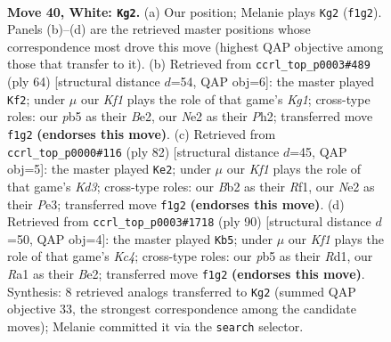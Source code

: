 \documentclass[11pt]{article}
\begin{document}
\clearpage

\begin{figure}[p]\centering
\begin{subfigure}{0.46\textwidth}\centering
\resizebox{\linewidth}{!}{%
\newchessgame
\chessboard[
  setfen={r5k1/4n3/8/pp6/b1p3P1/P1P1bN2/1B2N3/R4K2 w - - 4 40},
  showmover=false,
  pgfstyle=straightmove, color=movearrow, markmove={f1-g2}
]}
\caption{}
\end{subfigure}\hfill
\begin{subfigure}{0.46\textwidth}\centering
\resizebox{\linewidth}{!}{%
\newchessgame
\chessboard[
  setfen={2r3k1/1p2np2/4b3/pP5p/5P2/P3N3/4B2P/3R2K1 w - - 0 33},
  showmover=false,
  pgfstyle=straightmove, color=movearrow, markmove={g1-f2}
]}
\caption{}
\end{subfigure}
\\[4pt]
\begin{subfigure}{0.46\textwidth}\centering
\resizebox{\linewidth}{!}{%
\newchessgame
\chessboard[
  setfen={3r1k2/3b1p2/7p/3Nbp1P/2B5/1P1KP2P/8/5R2 w - - 17 42},
  showmover=false,
  pgfstyle=straightmove, color=movearrow, markmove={d3-e2}
]}
\caption{}
\end{subfigure}\hfill
\begin{subfigure}{0.46\textwidth}\centering
\resizebox{\linewidth}{!}{%
\newchessgame
\chessboard[
  setfen={2r3k1/5pp1/2n1pb1p/2P5/2K3P1/1N5P/1P2B3/3R4 w - - 3 46},
  showmover=false,
  pgfstyle=straightmove, color=movearrow, markmove={c4-b5}
]}
\caption{}
\end{subfigure}
\caption{\textbf{Move 40, White: \texttt{Kg2}.} (a) Our position; Melanie plays \texttt{Kg2} (\texttt{f1g2}). Panels (b)--(d) are the retrieved master positions whose correspondence most drove this move (highest QAP objective among those that transfer to it). (b) Retrieved from \texttt{ccrl\_top\_p0003\#489} (ply 64) [structural distance $d$=54, QAP obj=6]: the master played \texttt{Kf2}; under $\mu$ our \emph{Kf1} plays the role of that game's \emph{Kg1}; cross-type roles: our \emph{p}b5 as their \emph{B}e2, our \emph{N}e2 as their \emph{P}h2; transferred move \texttt{f1g2} \textbf{(endorses this move)}. (c) Retrieved from \texttt{ccrl\_top\_p0000\#116} (ply 82) [structural distance $d$=45, QAP obj=5]: the master played \texttt{Ke2}; under $\mu$ our \emph{Kf1} plays the role of that game's \emph{Kd3}; cross-type roles: our \emph{B}b2 as their \emph{R}f1, our \emph{N}e2 as their \emph{P}e3; transferred move \texttt{f1g2} \textbf{(endorses this move)}. (d) Retrieved from \texttt{ccrl\_top\_p0003\#1718} (ply 90) [structural distance $d$=50, QAP obj=4]: the master played \texttt{Kb5}; under $\mu$ our \emph{Kf1} plays the role of that game's \emph{Kc4}; cross-type roles: our \emph{p}b5 as their \emph{R}d1, our \emph{R}a1 as their \emph{B}e2; transferred move \texttt{f1g2} \textbf{(endorses this move)}. Synthesis: 8 retrieved analogs transferred to \texttt{Kg2} (summed QAP objective 33, the strongest correspondence among the candidate moves); Melanie committed it via the \texttt{search} selector.}
\label{fig:thought-m78}
\end{figure}
\end{document}
